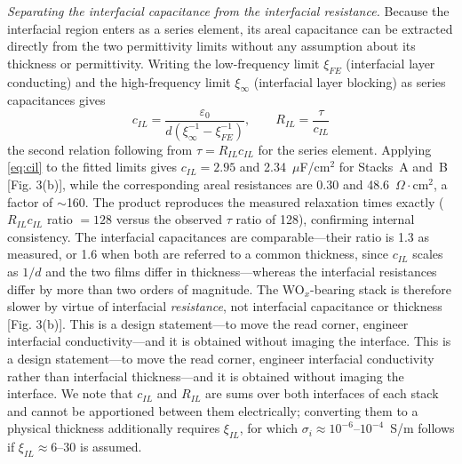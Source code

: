 \textit{Separating the interfacial capacitance from the interfacial
resistance.} Because the interfacial region enters as a series element, its
areal capacitance can be extracted directly from the two permittivity limits
without any assumption about its thickness or permittivity. Writing the
low-frequency limit $\xi_{FE}$ (interfacial layer conducting) and the
high-frequency limit $\xi_\infty$ (interfacial layer blocking) as series
capacitances gives
\begin{equation}
c_{IL} = \frac{\varepsilon_0}{d\left(\xi_\infty^{-1}-\xi_{FE}^{-1}\right)},
\qquad
R_{IL} = \frac{\tau}{c_{IL}}
\label{eq:cil}
\end{equation}
the second relation following from $\tau = R_{IL}c_{IL}$ for the series
element. Applying \eqref{eq:cil} to the fitted limits gives
$c_{IL} = 2.95$ and 2.34~$\mu$F/cm$^2$ for Stacks~A and~B [Fig. 3(b)], while the
corresponding areal resistances are 0.30 and 48.6~$\Omega\cdot$cm$^2$, a
factor of $\sim$160. The product reproduces the measured relaxation times
exactly ($R_{IL}c_{IL}$ ratio $= 128$ versus the observed $\tau$ ratio of
128), confirming internal consistency. The interfacial capacitances are
comparable---their ratio is 1.3 as measured, or 1.6 when both are referred to
a common thickness, since $c_{IL}$ scales as $1/d$ and the two films differ in
thickness---whereas the interfacial resistances differ by more than two orders
of magnitude. The WO$_x$-bearing stack is therefore slower by virtue of
interfacial \emph{resistance}, not interfacial capacitance or thickness
[Fig. 3(b)]. This is a design statement---to move the read
corner, engineer interfacial conductivity---and it is obtained without imaging
the interface. This is a design statement---to move the read corner, engineer
interfacial conductivity rather than interfacial thickness---and it is
obtained without imaging the interface. We note that $c_{IL}$ and $R_{IL}$
are sums over both interfaces of each stack and cannot be apportioned between
them electrically; converting them to a physical thickness additionally
requires $\xi_{IL}$, for which $\sigma_i \approx 10^{-6}$--$10^{-4}$~S/m
follows if $\xi_{IL} \approx 6$--30 is assumed.

